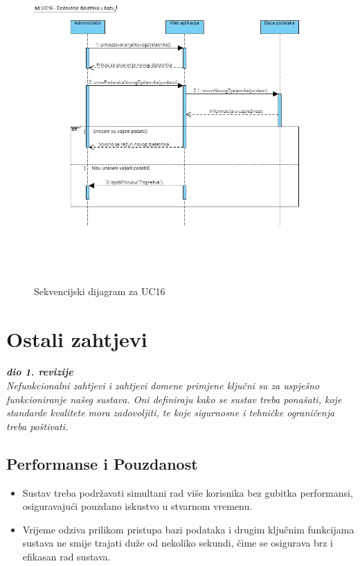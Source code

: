 \begin{figure}[p]
    \centering
    \includegraphics[width=\textwidth]{./slike/Sekvencijski - UC16.jpg} 
    \caption{Sekvencijski dijagram za UC16}
    \label{fig:my_image}
\end{figure}
\eject

\section{Ostali zahtjevi}


\textbf{\textit{dio 1. revizije}}\\

\textit{Nefunkcionalni zahtjevi i zahtjevi domene primjene ključni su za uspješno funkcioniranje našeg sustava. Oni definiraju kako se sustav treba ponašati, koje standarde kvalitete mora zadovoljiti, te koje sigurnosne i tehničke ograničenja treba poštivati.}

\subsection*{Performanse i Pouzdanost}
\begin{itemize}
    \item Sustav treba podržavati simultani rad više korisnika bez gubitka performansi, osiguravajući pouzdano iskustvo u stvarnom vremenu.
    \item Vrijeme odziva prilikom pristupa bazi podataka i drugim ključnim funkcijama sustava ne smije trajati duže od nekoliko sekundi, čime se osigurava brz i efikasan rad sustava.
\end{itemize}

